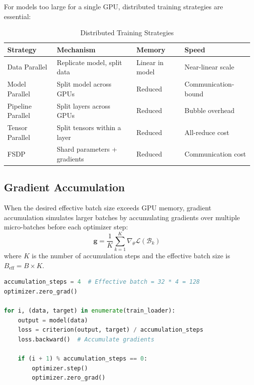 For models too large for a single GPU, distributed training strategies are essential:

\begin{table}[ht]
    \centering
    \caption{Distributed Training Strategies}
    \begin{tabular}{L{3cm} L{4cm} L{3cm} L{3cm}}
        \toprule
        \textbf{Strategy} & \textbf{Mechanism} & \textbf{Memory} & \textbf{Speed} \\
        \midrule
        Data Parallel & Replicate model, split data & Linear in model & Near-linear scale \\
        Model Parallel & Split model across GPUs & Reduced & Communication-bound \\
        Pipeline Parallel & Split layers across GPUs & Reduced & Bubble overhead \\
        Tensor Parallel & Split tensors within a layer & Reduced & All-reduce cost \\
        FSDP & Shard parameters + gradients & Reduced & Communication cost \\
        \bottomrule
    \end{tabular}
\end{table}

\subsection{Gradient Accumulation}

When the desired effective batch size exceeds GPU memory, gradient accumulation simulates larger batches by accumulating gradients over multiple micro-batches before each optimizer step:
\begin{equation}
\mathbf{g} = \frac{1}{K}\sum_{k=1}^{K} \nabla_\theta \mathcal{L}(\mathcal{B}_k)
\end{equation}
where $K$ is the number of accumulation steps and the effective batch size is $B_{\text{eff}} = B \times K$.

\begin{code}
    \label{code:grad_accum}
\begin{lstlisting}[language=python]
accumulation_steps = 4  # Effective batch = 32 * 4 = 128
optimizer.zero_grad()

for i, (data, target) in enumerate(train_loader):
    output = model(data)
    loss = criterion(output, target) / accumulation_steps
    loss.backward()  # Accumulate gradients
    
    if (i + 1) % accumulation_steps == 0:
        optimizer.step()
        optimizer.zero_grad()
\end{lstlisting}
\end{code}

